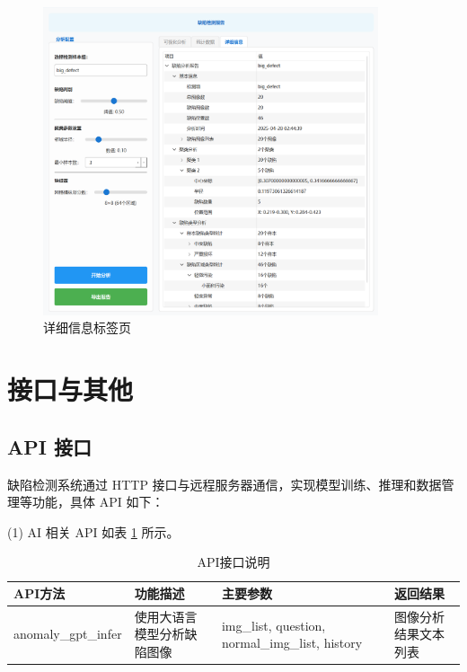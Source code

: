 \documentclass[
  ]{njuthesis}
\begin{document}
\begin{figure}[H]
    \centering
    \includegraphics[width=0.88\textwidth]{images/详细信息标签页.png}
    \caption{详细信息标签页}
    \label{详细信息标签页}
\end{figure}

\section{接口与其他}

\subsection{API 接口}

缺陷检测系统通过 HTTP 接口与远程服务器通信，实现模型训练、推理和数据管理等功能，具体 API 如下：

(1) AI 相关 API 如表 \ref{AI_API} 所示。

\begin{table}[H]
    \centering
    \caption{API接口说明}
    \label{AI_API}
    \renewcommand\arraystretch{0.5}
    \begin{tabular}{p{2.5cm}p{3.5cm}p{4cm}p{2.5cm}}
    \toprule[1.5pt]
    API方法 & 功能描述 & 主要参数 & 返回结果 \\
    \midrule[1pt]
    anomaly\_gpt\_infer & 使用大语言模型分析缺陷图像 & img\_list, question, normal\_img\_list, history & 图像分析结果文本列表 \\
    \bottomrule[1.5pt]
    \end{tabular}
\end{table}
\end{document}
